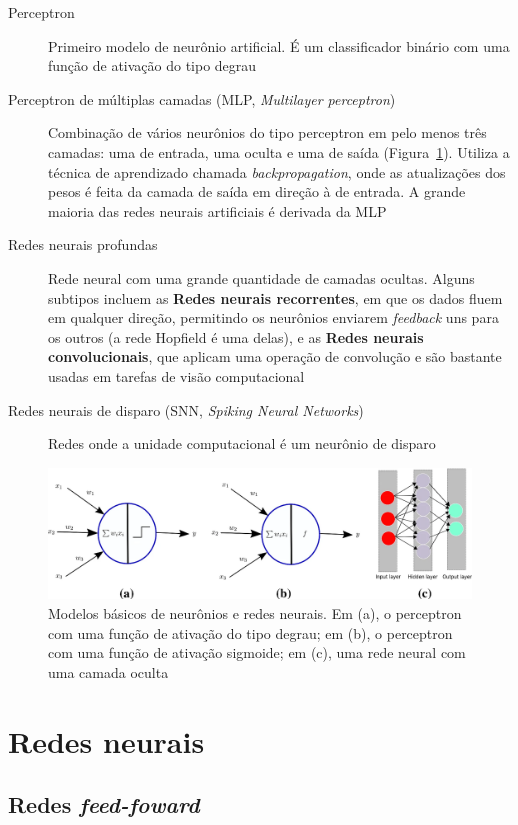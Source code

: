 \begin{description}
	\item[Perceptron] Primeiro modelo de neurônio artificial. É um classificador binário com uma função de ativação do tipo degrau
	\item[Perceptron de múltiplas camadas (MLP, \textit{Multilayer perceptron})] Combinação de vários neurônios do tipo perceptron em pelo menos três camadas: uma de entrada, uma oculta e uma de saída (Figura~\ref*{fig:modelosmlp}). Utiliza a técnica de aprendizado chamada \textit{backpropagation}, onde as atualizações dos pesos é feita da camada de saída em direção à de entrada. A grande maioria das redes neurais artificiais é derivada da MLP
	\item[Redes neurais profundas] Rede neural com uma grande quantidade de camadas ocultas. Alguns subtipos incluem as \textbf{Redes neurais recorrentes}, em que os dados fluem em qualquer direção, permitindo os neurônios enviarem \textit{feedback} uns para os outros (a rede Hopfield é uma delas), e as \textbf{Redes neurais convolucionais}, que aplicam uma operação de convolução e são bastante usadas em tarefas de visão computacional
	\item[Redes neurais de disparo (SNN, \textit{Spiking Neural Networks})] Redes onde a unidade computacional é um neurônio de disparo
\end{description}

\begin{figure}[htb!]
	\centering
	\caption{Modelos básicos de neurônios e redes neurais. Em (a), o perceptron com uma função de ativação do tipo degrau; em (b), o perceptron com uma função de ativação sigmoide; em (c), uma rede neural com uma camada oculta}
	\label{fig:modelosmlp}
	\includegraphics[width=0.9\linewidth]{figs/modelos_mlp}
\end{figure}


\section{Redes neurais}\label{sec:redesneurais}
\subsection{Redes \textit{feed-foward}}

